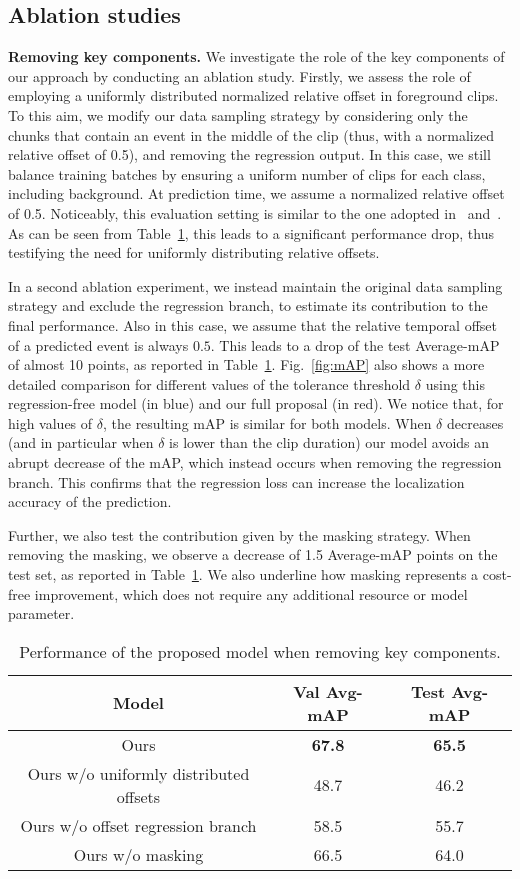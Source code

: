 \documentclass[a4paper,conference]{IEEEtran}
\newcommand{\tit}[1]{\smallbreak\noindent\textbf{#1.}}
\begin{document}
\subsection{Ablation studies}
\label{sec:ablations}
\tit{Removing key components}
We investigate the role of the key components of our approach by conducting an ablation study. 
Firstly, we assess the role of employing a uniformly distributed normalized relative offset in foreground clips. To this aim, we modify our data sampling strategy by considering only the chunks that contain an event in the middle of the clip (thus, with a normalized relative offset of 0.5), and removing the regression output. In this case, we still balance training batches by ensuring a uniform number of clips for each class, including background. At prediction time, we assume a normalized relative offset of 0.5. Noticeably, this evaluation setting is similar to the one adopted in~\cite{giancola2018soccernet} and~\cite{vats2020event}. As can be seen from Table~\ref{tab:abl}, this leads to a significant performance drop, thus testifying the need for uniformly distributing relative offsets. 

In a second ablation experiment, we instead maintain the original data sampling strategy and exclude the regression branch, to estimate its contribution to the final performance. Also in this case, we assume that the relative temporal offset of a predicted event is always $0.5$. This leads to a drop of the test Average-mAP of almost 10 points, as reported in Table~\ref{tab:abl}. Fig.~\ref{fig:mAP} also shows a more detailed comparison for different values of the tolerance threshold $\delta$ using this regression-free model (in blue) and our full proposal (in red). We notice that, for high values of $\delta$, the resulting mAP is similar for both models. When $\delta$ decreases (and in particular when $\delta$ is lower than the clip duration) our model avoids an abrupt decrease of the mAP, which instead occurs when removing the regression branch. This confirms that the regression loss can increase the localization accuracy of the prediction.

Further, we also test the contribution given by the masking strategy. When removing the masking, we observe a decrease of 1.5 Average-mAP points on the test set, as reported in Table~\ref{tab:abl}. We also underline how masking represents a cost-free improvement, which does not require any additional resource or model parameter.

\begin{table}[t]
\centering
\caption{Performance of the proposed model when removing key components.}
\begin{tabular}{ccc}
    \toprule 
    Model & Val Avg-mAP & Test Avg-mAP \\
    \midrule
    Ours & \textbf{67.8} & \textbf{65.5} \\
    Ours w/o uniformly distributed offsets & 48.7 & 46.2 \\
    Ours w/o offset regression branch & 58.5 & 55.7 \\
    Ours w/o masking & 66.5 & 64.0 \\
    \bottomrule
\end{tabular}
\label{tab:abl}
\end{table}
\end{document}
